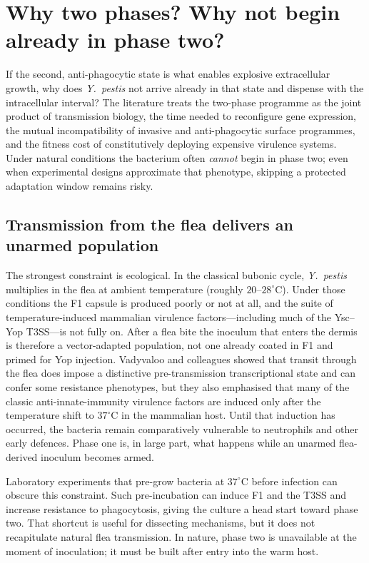\documentclass[11pt,a4paper]{article}
\begin{document}
\section{Why two phases? Why not begin already in phase two?}

If the second, anti-phagocytic state is what enables explosive extracellular growth, why does \textit{Y.\ pestis} not arrive already in that state and dispense with the intracellular interval? The literature treats the two-phase programme as the joint product of transmission biology, the time needed to reconfigure gene expression, the mutual incompatibility of invasive and anti-phagocytic surface programmes, and the fitness cost of constitutively deploying expensive virulence systems. Under natural conditions the bacterium often \emph{cannot} begin in phase two; even when experimental designs approximate that phenotype, skipping a protected adaptation window remains risky.

\subsection{Transmission from the flea delivers an unarmed population}

The strongest constraint is ecological. In the classical bubonic cycle, \textit{Y.\ pestis} multiplies in the flea at ambient temperature (roughly $20$--$28^\circ\mathrm{C}$). Under those conditions the F1 capsule is produced poorly or not at all, and the suite of temperature-induced mammalian virulence factors---including much of the Ysc--Yop T3SS---is not fully on. After a flea bite the inoculum that enters the dermis is therefore a vector-adapted population, not one already coated in F1 and primed for Yop injection. Vadyvaloo and colleagues showed that transit through the flea does impose a distinctive pre-transmission transcriptional state and can confer some resistance phenotypes, but they also emphasised that many of the classic anti-innate-immunity virulence factors are induced only after the temperature shift to $37^\circ\mathrm{C}$ in the mammalian host. Until that induction has occurred, the bacteria remain comparatively vulnerable to neutrophils and other early defences. Phase one is, in large part, what happens while an unarmed flea-derived inoculum becomes armed.

Laboratory experiments that pre-grow bacteria at $37^\circ\mathrm{C}$ before infection can obscure this constraint. Such pre-incubation can induce F1 and the T3SS and increase resistance to phagocytosis, giving the culture a head start toward phase two. That shortcut is useful for dissecting mechanisms, but it does not recapitulate natural flea transmission. In nature, phase two is unavailable at the moment of inoculation; it must be built after entry into the warm host.
\end{document}
